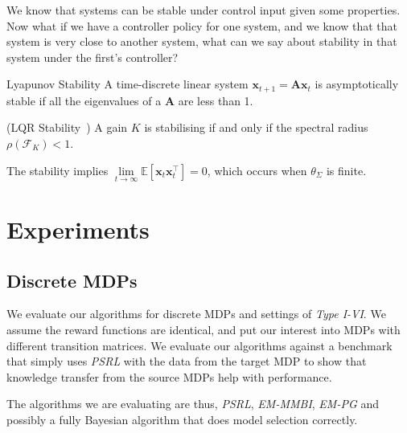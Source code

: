 We know that systems can be stable under control input given some properties. Now what if we have a controller policy for one system, and we know that that system is very close to another system, what can we say about stability in that system under the first's controller?

\begin{definition}{Lyapunov Stability}
    A time-discrete linear system $\bm{x}_{t+1} = \mathbf{A}\bm{x}_t$ is asymptotically stable if all the eigenvalues of a $\mathbf{A}$ are less than 1.
\end{definition}

\begin{lemma}{(LQR Stability~\cite{gravell2019learning})}
    A gain $K$ is stabilising if and only if the spectral radius $\rho(\mathcal{F}_K) < 1$.
\end{lemma}

The stability implies $\underset{t\rightarrow\infty}{\lim} \mathbb{E}[\bm{x}_t\bm{x}_t^\top] = 0$, which occurs when $\theta_\Sigma$ is finite.
\fi

\section{Experiments}\label{sec:experiments}

\subsection{Discrete MDPs}

We evaluate our algorithms for discrete MDPs and settings of \emph{Type I-VI}. We assume the reward functions are identical, and put our interest into MDPs with different transition matrices. We evaluate our algorithms against a benchmark that simply uses \emph{PSRL} with the data from the target MDP to show that knowledge transfer from the source MDPs help with performance.

The algorithms we are evaluating are thus, \emph{PSRL}, \emph{EM-MMBI}, \emph{EM-PG} and possibly a fully Bayesian algorithm that does model selection correctly.


